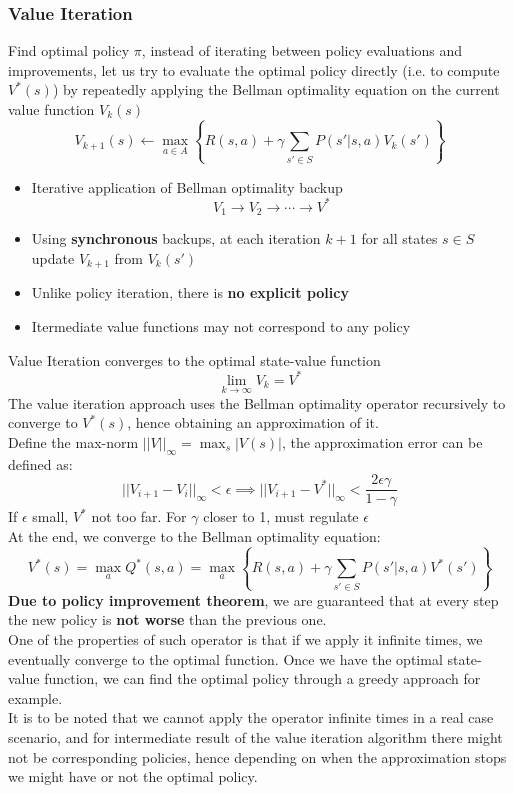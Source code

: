 \subsubsection{Value Iteration}
    Find optimal policy $\pi$, instead of iterating between policy evaluations and improvements, let us try to evaluate the optimal policy directly (i.e. to compute $V^*(s)$) by repeatedly applying the Bellman optimality equation on the current value function $V_k(s)$
    $$V_{k+1}(s)\leftarrow\max_{a\in A}\left\{R(s,a)+\gamma\sum_{s'\in S}P(s'|s,a)V_k(s')\right\}$$
    \begin{itemize}
        \item Iterative application of Bellman optimality backup
        $$V_1\rightarrow V_2\rightarrow \cdots \rightarrow V^*$$
        \item Using \textbf{synchronous} backups, at each iteration $k+1$ for all states $s \in S$ update $V_{k+1}$ from $V_k(s')$
        \item Unlike policy iteration, there is \textbf{no explicit policy}
        \item Itermediate value functions may not correspond to any policy
    \end{itemize}
    Value Iteration converges to the optimal state-value function
    $$\lim_{k\rightarrow \infty}V_k=V^*$$
    The value iteration approach uses the Bellman optimality operator recursively to converge to $V^*(s)$, hence obtaining an approximation of it.\\
    Define the max-norm $||V||_\infty=\max_s|V(s)|$, the approximation error can be defined as:
    $$||V_{i+1}-V_i||_\infty<\epsilon\implies ||V_{i+1}-V^*||_\infty<\frac{2\epsilon\gamma}{1-\gamma}$$
    If $\epsilon$ small, $V^*$ not too far. For $\gamma$ closer to 1, must regulate $\epsilon$\\
    At the end, we converge to the Bellman optimality equation:
    $$V^*(s)=\max_aQ^*(s,a)=\max_a\left\{R(s,a)+\gamma\sum_{s' \in S}P(s'|s,a)V^*(s')\right\}$$
    \textbf{Due to policy improvement theorem}, we are guaranteed that at every step the new policy is \textbf{not worse} than the previous one.\\
    One of the properties of such operator is that if we apply it infinite times, we eventually converge to the optimal function. Once we have the optimal state-value function, we can find the optimal policy through a greedy approach for example. \\
    It is to be noted that we cannot apply the operator infinite times in a real case scenario, and for intermediate result of the value iteration algorithm there might not be corresponding policies, hence depending on when the approximation stops we might have or not the optimal policy.

